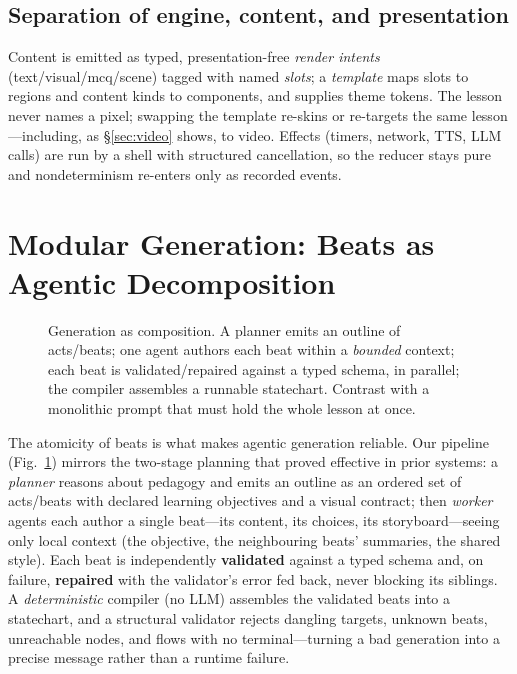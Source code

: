 \documentclass[sigconf,review,anonymous]{acmart}
\begin{document}
\subsection{Separation of engine, content, and presentation}
Content is emitted as typed, presentation-free \emph{render intents}
(text/visual/mcq/scene) tagged with named \emph{slots}; a \emph{template} maps
slots to regions and content kinds to components, and supplies theme tokens. The
lesson never names a pixel; swapping the template re-skins or re-targets the
same lesson---including, as \S\ref{sec:video} shows, to video. Effects (timers,
network, TTS, LLM calls) are run by a shell with structured cancellation, so the
reducer stays pure and nondeterminism re-enters only as recorded events.

\section{Modular Generation: Beats as Agentic Decomposition}
\label{sec:agentic}

\begin{figure}[t]
  \centering
  \resizebox{\columnwidth}{!}{}
  \caption{Generation as composition. A planner emits an outline of acts/beats;
  one agent authors each beat within a \emph{bounded} context; each beat is
  validated/repaired against a typed schema, in parallel; the compiler assembles
  a runnable statechart. Contrast with a monolithic prompt that must hold the
  whole lesson at once.}
  \label{fig:agentic}
\end{figure}

The atomicity of beats is what makes agentic generation reliable. Our pipeline
(Fig.~\ref{fig:agentic}) mirrors the two-stage planning that proved effective in
prior systems: a \emph{planner} reasons about pedagogy and emits an outline as an
ordered set of acts/beats with declared learning objectives and a visual
contract; then \emph{worker} agents each author a single beat---its content,
its choices, its storyboard---seeing only local context (the objective, the
neighbouring beats' summaries, the shared style). Each beat is independently
\textbf{validated} against a typed schema and, on failure, \textbf{repaired}
with the validator's error fed back, never blocking its siblings. A
\emph{deterministic} compiler (no LLM) assembles the validated beats into a
statechart, and a structural validator rejects dangling targets, unknown beats,
unreachable nodes, and flows with no terminal---turning a bad generation into a
precise message rather than a runtime failure.
\end{document}
